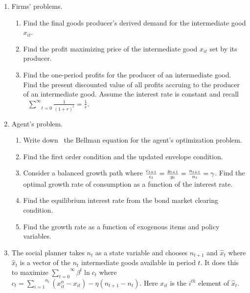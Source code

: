 \documentclass[11pt]{article}
\begin{document}
\begin{enumerate}
\item Firms' problems.

\begin{enumerate}
\item Find the final goods producer's derived demand for the intermediate
good $x_{it}$.

\item Find the profit maximizing price of the intermediate good $x_{it}$ set
by its producer.

\item Find the one-period profits for the producer of an intermediate good.
Find the present discounted value of all profits accruing to the producer of
an intermediate good. Assume the interest rate is constant and recall $%
\underset{t=0}{\overset{\infty }{\text{ }\sum }}\frac{1}{\left( 1+r\right)
^{t}}=\frac{1}{r}.$
\end{enumerate}

\item Agent's problem.

\begin{enumerate}
\item Write down \ the Bellman equation for the agent's optimization problem.

\item Find the first order condition and the updated envelope condition.

\item Consider a balanced growth path where $\frac{c_{t+1}}{c_{t}}=\frac{%
y_{t+1}}{y_{t}}=\frac{n_{t+1}}{n_{t}}=\gamma $. Find the optimal growth rate
of consumption as a function of the interest rate.

\item Find the equilibrium interest rate from the bond market clearing
condition.

\item Find the growth rate as a function of exogenous items and policy
variables.
\end{enumerate}

\item The social planner takes $n_{t}$ as a state variable and chooses $%
n_{t+1}$ and $\hat{x}_{t}$ where $\hat{x}_{t}$ is a vector of the $n_{t}$
intermediate goods available in period $t$. It does this to maximize $%
\overset{\infty }{\underset{t=0}{\sum }}\beta ^{t}\ln c_{t}$ where $c_{t}=%
\overset{n_{t}}{\underset{i=1}{\sum }}\left( x_{it}^{\alpha }-x_{it}\right)
-\eta \left( n_{t+1}-n_{t}\right) .$ Here $x_{it}$ is the $i^{th}$ element
of $\hat{x}_{t}.$


\end{enumerate}
\end{document}
